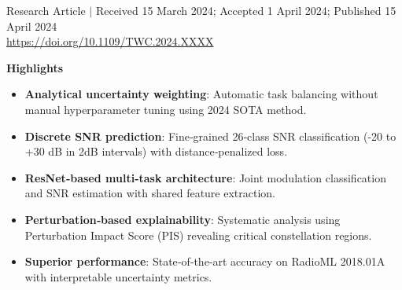 \documentclass{ELSP}
\begin{document}
\thispagestyle{firstpage}

\let\thefootnote\relax
{}

\begin{flushleft}
{\sffamily \small Research Article $\mid$ Received 15 March 2024; Accepted 1 April 2024; Published 15 April 2024}\\
{\sffamily \small\url{https://doi.org/10.1109/TWC.2024.XXXX}}




\end{flushleft}

\vspace{0.5em}
\noindent\textbf{\textcolor[RGB]{0,131,255}{Highlights}}
\begin{itemize}
  \item \textbf{Analytical uncertainty weighting}: Automatic task balancing without manual hyperparameter tuning using 2024 SOTA method.
  \item \textbf{Discrete SNR prediction}: Fine‑grained 26‑class SNR classification (-20 to +30 dB in 2dB intervals) with distance‑penalized loss.
  \item \textbf{ResNet‑based multi‑task architecture}: Joint modulation classification and SNR estimation with shared feature extraction.
  \item \textbf{Perturbation‑based explainability}: Systematic analysis using Perturbation Impact Score (PIS) revealing critical constellation regions.
  \item \textbf{Superior performance}: State‑of‑the‑art accuracy on RadioML 2018.01A with interpretable uncertainty metrics.
\end{itemize}
\end{document}
